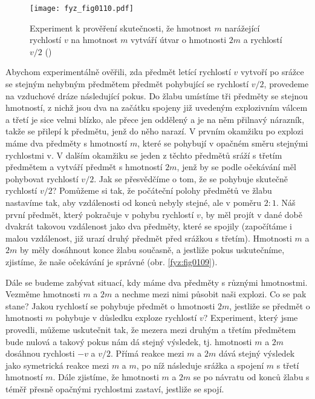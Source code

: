     \begin{figure}[ht!]  %
      \centering
      \texttt{[image: fyz\_fig0110.pdf]}
      \caption{Experiment k prověření skutečnosti, že hmotnost \(m\) narážející rychlostí \(v\) na hmotnost 
               \(m\) vytváří útvar o hmotnosti \(2m\) a rychlostí \(v/2\)
              (\cite[s.~146]{Feynman01})}
      \label{fyz:fig0110}
    \end{figure}
    Abychom experimentálně ověřili, zda předmět letící rychlostí \(v\) vytvoří po srážce se stejným 
    nehybným předmětem předmět pohybující se rychlostí \(v/2\), provedeme na vzduchové dráze 
    následující pokus. Do žlabu umístíme tři předměty se stejnou hmotností, z nichž jsou dva na 
    začátku spojeny již uvedeným explozivním válcem a třetí je sice velmi blízko, ale přece jen 
    oddělený a je na něm přilnavý nárazník, takže se přilepí k předmětu, jenž do něho narazí. V 
    prvním okamžiku po explozi máme dva předměty s hmotností \(m\), které se pohybují v opačném 
    směru stejnými rychlostmi v. V dalším okamžiku se jeden z těchto předmětů sráží s třetím 
    předmětem a vytváří předmět s hmotností \(2m\), jenž by se podle očekávání měl pohybovat 
    rychlostí \(v/2\). Jak se přesvědčíme o tom, že se pohybuje skutečně rychlostí \(v/2\)? 
    Pomůžeme si tak, že počáteční polohy předmětů ve žlabu nastavíme tak, aby vzdálenosti od konců 
    nebyly stejné, ale v poměru \(2:1\). Náš první předmět, který pokračuje v pohybu rychlostí 
    \(v\), by měl projít v dané době dvakrát takovou vzdálenost jako dva předměty, které se spojily 
    (započítáme i malou vzdálenost, již urazí druhý předmět před srážkou s třetím). Hmotnosti \(m\) 
    a \(2m\) by měly dosáhnout konce žlabu současně, a jestliže pokus uskutečníme, zjistíme, že 
    naše očekávání je správné (obr. \ref{fyz:fig0109}).

    Dále se budeme zabývat situací, kdy máme dva předměty s různými hmotnostmi. Vezměme hmotnosti 
    \(m\) a \(2m\) a nechme mezi nimi působit naši explozi. Co se pak stane? Jakou rychlostí se 
    pohybuje předmět o hmotnosti \(2m\), jestliže se předmět o hmotnosti \(m\) pohybuje v důsledku 
    exploze rychlostí \(v\)? Experiment, který jsme provedli, můžeme uskutečnit tak, že mezera mezi 
    druhým a třetím předmětem bude nulová a takový pokus nám dá stejný výsledek, tj. hmotnosti 
    \(m\) a \(2m\) dosáhnou rychlosti \(-v\) a \(v/2\). Přímá reakce mezi \(m\) a \(2m\) dává 
    stejný výsledek jako symetrická reakce mezi \(m\) a \(m\), po níž následuje srážka a spojení 
    \(m\) s třetí hmotností \(m\). Dále zjistíme, že hmotnosti \(m\) a \(2m\) se po návratu od 
    konců žlabu s téměř přesně opačnými rychlostmi zastaví, jestliže se spojí.

